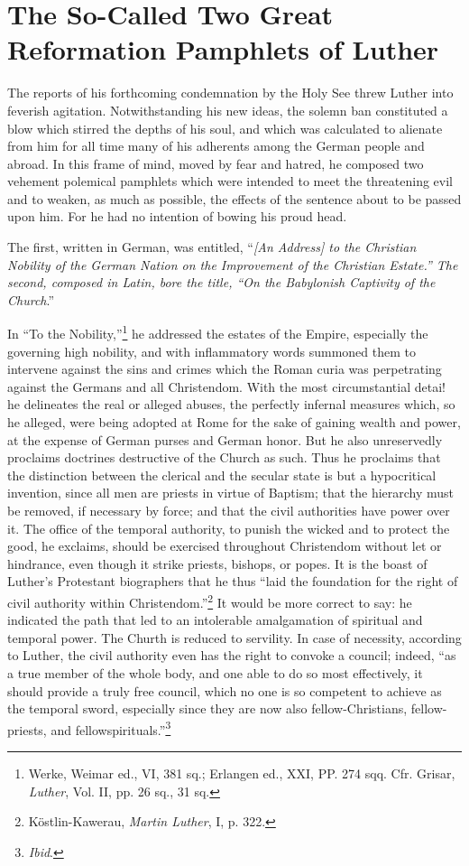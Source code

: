 \section{The So-Called Two Great Reformation Pamphlets of Luther}

The reports of his forthcoming condemnation by the Holy See
threw Luther into feverish agitation. Notwithstanding his new ideas,
the solemn ban constituted a blow which stirred the depths of his
soul, and which was calculated to alienate from him for all time
many of his adherents among the German people and abroad. In this
frame of mind, moved by fear and hatred, he composed two vehement
polemical pamphlets which were intended to meet the threatening
evil and to weaken, as much as possible, the effects of the sentence
about to be passed upon him. For he had no intention of bowing his
proud head.

The first, written in German, was entitled, ``\textit{[An Address] to
the Christian Nobility of the German Nation on the Improvement
of the Christian Estate.” The second, composed in Latin, bore the
title, “On the Babylonish Captivity of the Church}.''

In “To the Nobility,”\footnote
{Werke, Weimar ed., VI, 381 sq.; Erlangen ed., XXI, PP. 274 sqq. Cfr. Grisar, \textit{Luther},
Vol. II, pp. 26 sq., 31 sq.}
he addressed the estates of the Empire,
especially the governing high nobility, and with inflammatory words
summoned them to intervene against the sins and crimes which the
Roman curia was perpetrating against the Germans and all Christendom.
With the most circumstantial detai! he delineates the real or
alleged abuses, the perfectly infernal measures which, so he alleged,
were being adopted at Rome for the sake of gaining wealth and
power, at the expense of German purses and German honor. But he
also unreservedly proclaims doctrines destructive of the Church as
such. Thus he proclaims that the distinction between the clerical and
the secular state is but a hypocritical invention, since all men are
priests in virtue of Baptism; that the hierarchy must be removed, if
necessary by force; and that the civil authorities have power over it.
The office of the temporal authority, to punish the wicked and to protect
the good, he exclaims, should be exercised throughout Christendom
without let or hindrance, even though it strike priests, bishops,
or popes. It is the boast of Luther’s Protestant biographers that he
thus “laid the foundation for the right of civil authority within
Christendom.”\footnote{Köstlin-Kawerau, \textit{Martin Luther}, I, p. 322.}
It would be more correct to say: he indicated the
path that led to an intolerable amalgamation of spiritual and temporal
power. The Churth is reduced to servility. In case of necessity, according
to Luther, the civil authority even has the right to convoke a
council; indeed, “as a true member of the whole body, and one able
to do so most effectively, it should provide a truly free council, which
no one is so competent to achieve as the temporal sword, especially
since they are now also fellow-Christians, fellow-priests, and fellowspirituals.”\footnote{\textit{Ibid}.}

